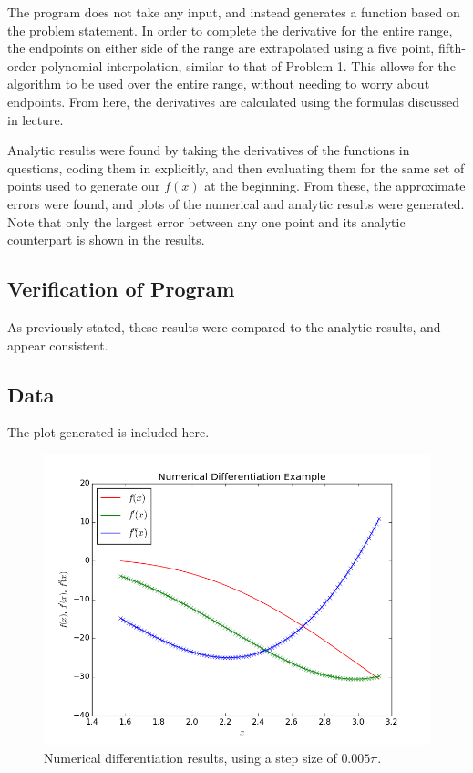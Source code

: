 \documentclass[10pt,letter]{article}
\begin{document}
The program does not take any input, and instead generates a function based on the problem statement. In order to complete the derivative for the entire range, the endpoints on either side of the range are extrapolated using a five point, fifth-order polynomial interpolation, similar to that of Problem 1. This allows for the algorithm to be used over the entire range, without needing to worry about endpoints. From here, the derivatives are calculated using the formulas discussed in lecture.

Analytic results were found by taking the derivatives of the functions in questions, coding them in explicitly, and then evaluating them for the same set of points used to generate our $f(x)$ at the beginning. From these, the approximate errors were found, and plots of the numerical and analytic results were generated. Note that only the largest error between any one point and its analytic counterpart is shown in the results.

\subsection{Verification of Program}

As previously stated, these results were compared to the analytic results, and appear consistent.

\pagebreak

\subsection{Data}

The plot generated is included here.

\begin{figure}[h]
  \centering
    \includegraphics[width=.8\textwidth]{homework1_problem2_plot1}
  \caption{Numerical differentiation results, using a step size of $0.005\pi$.}
\end{figure}
\end{document}
